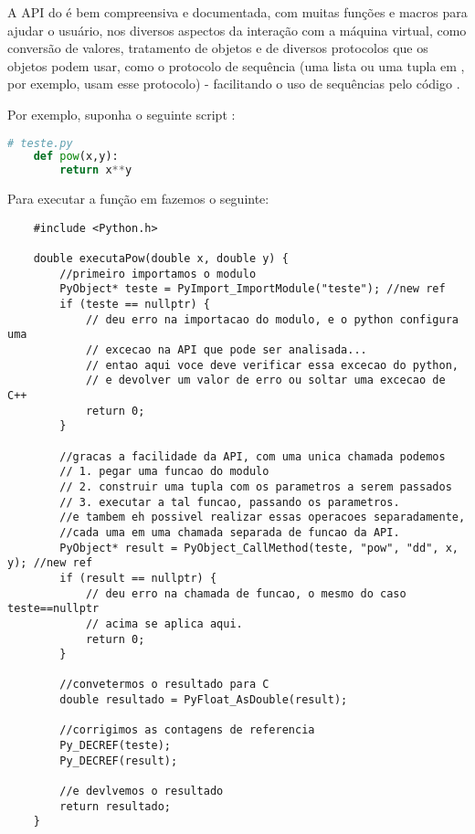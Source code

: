     A API \C{} do  é bem compreensiva e documentada, com muitas funções e
    macros para ajudar o usuário, nos diversos aspectos da interação com a
    máquina virtual, como conversão de valores, tratamento de objetos e de
    diversos protocolos que os objetos podem usar, como o protocolo de sequência
    (uma lista ou uma tupla em , por exemplo, usam esse protocolo) -
    facilitando o uso de sequências pelo código \C{}.
    
    Por exemplo, suponha o seguinte script :
      
    \vspace{1em}

    \begin{lstlisting}[language=python]
    # teste.py
    def pow(x,y):
        return x**y
    \end{lstlisting}
      
    \vspace{1em}
    
    Para executar a função  em \CXX{} fazemos o seguinte:
      
    \vspace{1em}

    \begin{lstlisting}
    #include <Python.h>
    
    double executaPow(double x, double y) {
        //primeiro importamos o modulo
        PyObject* teste = PyImport_ImportModule("teste"); //new ref
        if (teste == nullptr) {
            // deu erro na importacao do modulo, e o python configura uma 
            // excecao na API que pode ser analisada...
            // entao aqui voce deve verificar essa excecao do python,
            // e devolver um valor de erro ou soltar uma excecao de C++
            return 0;
        }
        
        //gracas a facilidade da API, com uma unica chamada podemos
        // 1. pegar uma funcao do modulo
        // 2. construir uma tupla com os parametros a serem passados
        // 3. executar a tal funcao, passando os parametros.
        //e tambem eh possivel realizar essas operacoes separadamente,
        //cada uma em uma chamada separada de funcao da API.
        PyObject* result = PyObject_CallMethod(teste, "pow", "dd", x, y); //new ref
        if (result == nullptr) {
            // deu erro na chamada de funcao, o mesmo do caso teste==nullptr
            // acima se aplica aqui.
            return 0;
        }
        
        //convetermos o resultado para C
        double resultado = PyFloat_AsDouble(result);
        
        //corrigimos as contagens de referencia
        Py_DECREF(teste);
        Py_DECREF(result);
        
        //e devlvemos o resultado
        return resultado;
    }
    \end{lstlisting}
      
